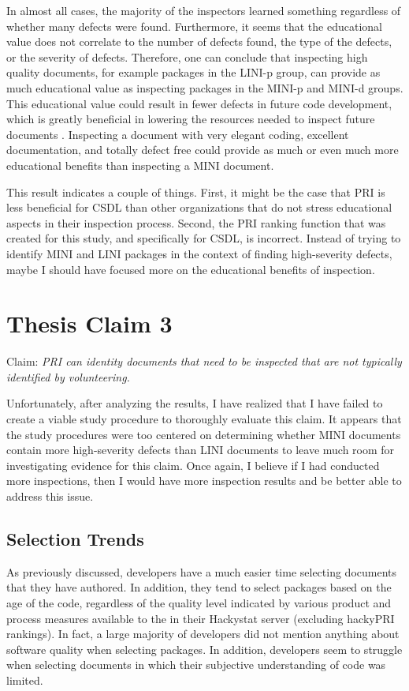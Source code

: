 In almost all cases, the majority of the inspectors learned something
regardless of whether many defects were found. Furthermore, it seems that
the educational value does not correlate to the number of defects found,
the type of the defects, or the severity of defects. Therefore, one can
conclude that inspecting high quality documents, for example packages in
the LINI-p group, can provide as much educational value as inspecting
packages in the MINI-p and MINI-d groups. This educational value could
result in fewer defects in future code development, which is greatly
beneficial in lowering the resources needed to inspect future documents
\cite{Gilb93}. Inspecting a document with very elegant coding, excellent
documentation, and totally defect free could provide as much or even much
more educational benefits than inspecting a MINI document.

This result indicates a couple of things. First, it might be the case that
PRI is less beneficial for CSDL than other organizations that do not stress
educational aspects in their inspection process. Second, the PRI ranking
function that was created for this study, and specifically for CSDL, is
incorrect. Instead of trying to identify MINI and LINI packages in the
context of finding high-severity defects, maybe I should have focused more
on the educational benefits of inspection.



\section{Thesis Claim 3}
\label{section:claim3}
\noindent Claim: \textit{PRI can identity documents that need to be
  inspected that are not typically identified by volunteering.} \newline

Unfortunately, after analyzing the results, I have realized that I have
failed to create a viable study procedure to thoroughly evaluate this
claim. It appears that the study procedures were too centered on
determining whether MINI documents contain more high-severity defects than
LINI documents to leave much room for investigating evidence for this
claim. Once again, I believe if I had conducted more inspections, then I
would have more inspection results and be better able to address this
issue.

\subsection{Selection Trends}
As previously discussed, developers have a much easier time selecting
documents that they have authored. In addition, they tend to select
packages based on the age of the code, regardless of the quality level
indicated by various product and process measures available to the in their
Hackystat server (excluding hackyPRI rankings). In fact, a large majority
of developers did not mention anything about software quality when
selecting packages. In addition, developers seem to struggle when selecting
documents in which their subjective understanding of code was limited.

